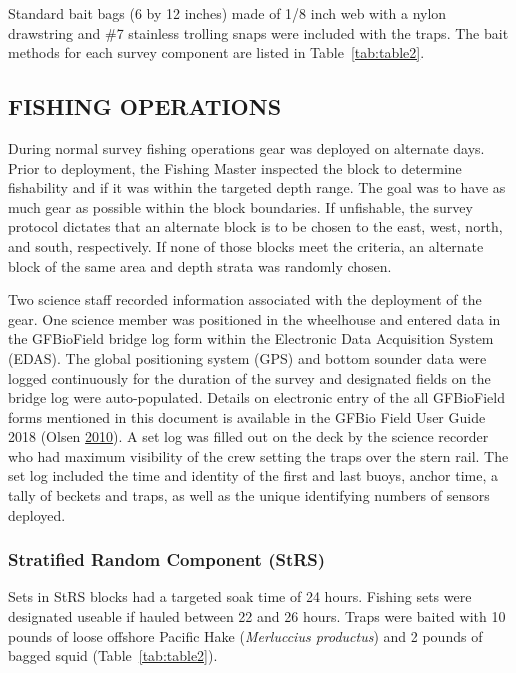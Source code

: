 \documentclass[12pt]{article}\usepackage[]{graphicx}\usepackage[]{color}
\begin{document}
Standard bait bags (6 by 12 inches) made of 1/8 inch web with a nylon drawstring and \#7 stainless trolling snaps were included with the traps. The bait methods for each survey component are listed in Table~\ref{tab:table2}.

\hypertarget{fishing-operations}{%
\subsection{FISHING OPERATIONS}\label{fishing-operations}}

During normal survey fishing operations gear was deployed on alternate days. Prior to deployment, the Fishing Master inspected the block to determine fishability and if it was within the targeted depth range. The goal was to have as much gear as possible within the block boundaries. If unfishable, the survey protocol dictates that an alternate block is to be chosen to the east, west, north, and south, respectively. If none of those blocks meet the criteria, an alternate block of the same area and depth strata was randomly chosen.

Two science staff recorded information associated with the deployment of the gear. One science member was positioned in the wheelhouse and entered data in the GFBioField bridge log form within the Electronic Data Acquisition System (EDAS). The global positioning system (GPS) and bottom sounder data were logged continuously for the duration of the survey and designated fields on the bridge log were auto-populated. Details on electronic entry of the all GFBioField forms mentioned in this document is available in the GFBio Field User Guide 2018 (Olsen \protect\hyperlink{ref-Olsen2010}{2010}). A set log was filled out on the deck by the science recorder who had maximum visibility of the crew setting the traps over the stern rail. The set log included the time and identity of the first and last buoys, anchor time, a tally of beckets and traps, as well as the unique identifying numbers of sensors deployed.

\hypertarget{stratified-random-component-strs}{%
\subsubsection{Stratified Random Component (StRS)}\label{stratified-random-component-strs}}

Sets in StRS blocks had a targeted soak time of 24 hours. Fishing sets were designated useable if hauled between 22 and 26 hours. Traps were baited with 10 pounds of loose offshore Pacific Hake (\emph{Merluccius productus}) and 2 pounds of bagged squid (Table~\ref{tab:table2}).
\end{document}
